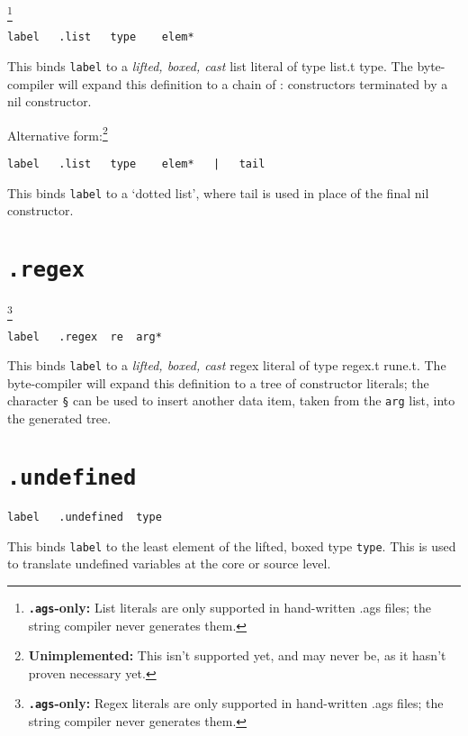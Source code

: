\documentclass{report}
\newcommand\stringcode[1]{\texttt{#1}}
\newcommand\unimpl[1]{\footnote{\textbf{Unimplemented: }#1}}
\newcommand\agsonly[1]{\footnote{\textbf{\texttt{.ags}-only: }#1}}
\begin{document}
\agsonly{List literals are only supported in hand-written .ags files; the string compiler never generates them.}

\begin{verbatim}
label	.list	type	elem*
\end{verbatim}

This binds \stringcode{label} to a \emph{lifted, boxed, cast} list literal of type \<list.t type\>.
The byte-compiler will expand this definition to a chain of \<:\> constructors terminated by a \<nil\> constructor.

Alternative form:\unimpl{This isn't supported yet, and may never be, as it hasn't proven necessary yet.}

\begin{verbatim}
label	.list	type	elem*	|	tail
\end{verbatim}

This binds \stringcode{label} to a `dotted list', where \<tail\> is used in place of the final \<nil\> constructor.

\section{\stringcode{.regex}}

\agsonly{Regex literals are only supported in hand-written .ags files; the string compiler never generates them.}

\begin{verbatim}
label	.regex	re	arg*
\end{verbatim}

This binds \stringcode{label} to a \emph{lifted, boxed, cast} regex literal of type \<regex.t rune.t\>.
The byte-compiler will expand this definition to a tree of constructor literals;
the character \stringcode{§} can be used to insert another data item, taken from the \stringcode{arg} list, into the generated tree.

\section{\stringcode{.undefined}}

\begin{verbatim}
label	.undefined	type
\end{verbatim}

This binds \stringcode{label} to the least element of the lifted, boxed type \stringcode{type}.
This is used to translate undefined variables at the core or source level.
\end{document}
